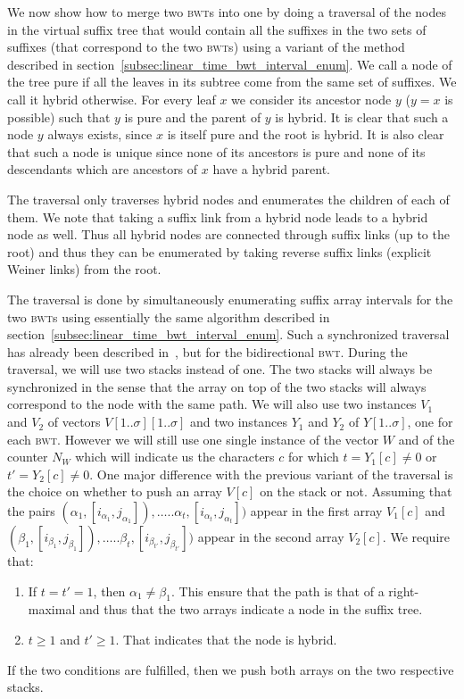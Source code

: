 \documentclass[a4paper]{article}
\begin{document}
We now show how to merge two \textsc{bwt}s 
into one by doing a traversal of the nodes in the virtual suffix tree 
that would contain all the suffixes in the two sets of suffixes (that correspond
to the two \textsc{bwt}s) using a variant of the method described 
in section~\ref{subsec:linear_time_bwt_interval_enum}. 
We call a node of the tree pure if all the leaves in its subtree 
come from the same set of suffixes. We call it hybrid otherwise. 
For every leaf $x$ we consider its ancestor node $y$ ($y=x$ is possible)
such that $y$ is pure and the parent of $y$ is hybrid. 
It is clear that such a node $y$ always exists, since $x$ is itself pure and 
the root is hybrid. It is also clear that such a node is unique since none of 
its ancestors is pure and none of its descendants which are ancestors of 
$x$ have a hybrid parent. 

The traversal only traverses hybrid nodes and enumerates the children 
of each of them. We note that taking a suffix link from a hybrid node
leads to a hybrid node as well. Thus all hybrid nodes are connected through 
suffix links (up to the root) 
and thus they can be enumerated by taking reverse suffix links
(explicit Weiner links) from the root. 

The traversal is done by simultaneously enumerating suffix array 
intervals for the two \textsc{bwt}s using essentially the same algorithm 
described in section~\ref{subsec:linear_time_bwt_interval_enum}. 
Such a synchronized traversal has already been described in~\cite{BCKM13}, 
but for the bidirectional \textsc{bwt}. 
During the traversal, we will use two stacks instead of one. The 
two stacks will always be synchronized in the sense that the array 
on top of the two stacks will always correspond to the node 
with the same path. 
We will also use two instances $V_1$ and $V_2$ of vectors  
$V[1..\sigma][1..\sigma]$ and two instances $Y_1$ and $Y_2$ of 
$Y[1..\sigma]$, one for each \textsc{bwt}. However we will still 
use one single instance of the vector $W$ and of the 
counter $N_W$ which will indicate us the characters $c$ for which
$t=Y_1[c]\neq 0$ or $t'=Y_2[c]\neq 0$. 
One major difference with the previous variant of the 
traversal is the choice on whether to push an array $V[c]$ on the stack or not. 
Assuming that the pairs $(\alpha_1,[i_{\alpha_1},j_{\alpha_1}]),\ldots..\alpha_t,[i_{\alpha_t},j_{\alpha_t}])$
appear in the first array $V_1[c]$ and 
$(\beta_1,[i_{\beta_1},j_{\beta_1}]),\ldots..\beta_t,[i_{\beta_{t'}},j_{\beta_{t'}}])$ 
appear in the second array $V_2[c]$. 
We require that:
\begin{enumerate} 
\item If $t=t'=1$, then $\alpha_1\neq \beta_1$. This ensure that the path 
is that of a right-maximal and thus that the two arrays indicate 
a node in the suffix tree. 
\item $t\geq 1$ and $t'\geq 1$. That indicates that the node is hybrid. 
\end{enumerate}
If the two conditions are fulfilled, then we push both arrays on
the two respective stacks. 
\end{document}
